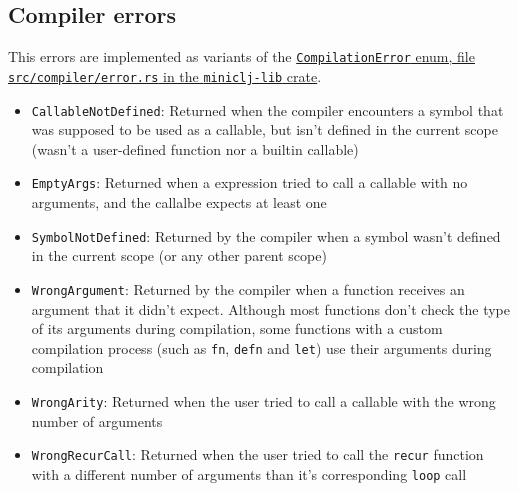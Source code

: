 \documentclass[11pt]{scrreprt}
\begin{document}
\subsection{Compiler errors}
This errors are implemented as variants of the \href{https://github.com/MarioJim/miniclj/blob/263ce60c5847511cdae9b27d79e5db1ae18759a2/miniclj-lib/src/compiler/error.rs#L10}{\texttt{CompilationError} enum, file \texttt{src/compiler/error.rs} in the \texttt{miniclj-lib} crate}.
\begin{itemize}
  \item \texttt{CallableNotDefined}: Returned when the compiler encounters a symbol that was supposed to be used as a callable, but isn't defined in the current scope (wasn't a user-defined function nor a builtin callable)
  \item \texttt{EmptyArgs}: Returned when a expression tried to call a callable with no arguments, and the callalbe expects at least one
  \item \texttt{SymbolNotDefined}: Returned by the compiler when a symbol wasn't defined in the current scope (or any other parent scope)
  \item \texttt{WrongArgument}: Returned by the compiler when a function receives an argument that it didn't expect. Although most functions don't check the type of its arguments during compilation, some functions with a custom compilation process (such as \texttt{fn}, \texttt{defn} and \texttt{let}) use their arguments during compilation
  \item \texttt{WrongArity}: Returned when the user tried to call a callable with the wrong number of arguments
  \item \texttt{WrongRecurCall}: Returned when the user tried to call the \texttt{recur} function with a different number of arguments than it's corresponding \texttt{loop} call
\end{itemize}
\end{document}
